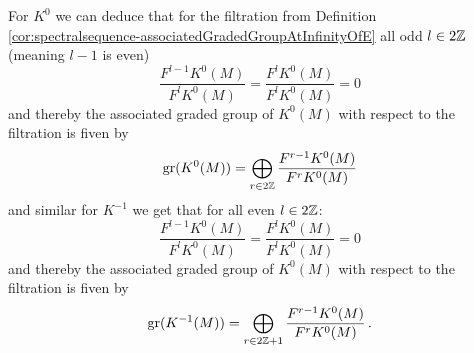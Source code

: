 \begin{corollary}\label{cor:spectralsequence-gradingforK0AndK-1}
	For $K^0$ we can deduce that for the filtration from Definition \ref{cor:spectralsequence-associatedGradedGroupAtInfinityOfE} all odd $l\in 2\mathbb{Z}$ (meaning $l-1$ is even)
	\begin{equation*}
		 \frac{F^{l-1}K^0(M)}{F^lK^0(M)}= \frac{F^{l}K^0(M)}{F^lK^0(M)}=0
	\end{equation*}
	and thereby the associated graded group of $K^0(M)$ with respect to the filtration is fiven by
	\begin{equation*}
		\mathrm{gr}(K^0(M))=\bigoplus_{r\in 2\mathbb{Z}} \frac{F^{r-1}K^0(M)}{F^rK^0(M)}
	\end{equation*} and similar for $K^{-1}$ we get that for all even $l\in 2\mathbb{Z}$:
	\begin{equation*}
		 \frac{F^{l-1}K^0(M)}{F^lK^0(M)}= \frac{F^{l}K^0(M)}{F^lK^0(M)}=0
	\end{equation*}
	and thereby the associated graded group of $K^0(M)$ with respect to the filtration is fiven by
	\begin{equation*}
		\mathrm{gr}(K^{-1}(M))=\bigoplus_{r\in 2\mathbb{Z}+1} \frac{F^{r-1}K^0(M)}{F^rK^0(M)}\,.
	\end{equation*}
\end{corollary}


